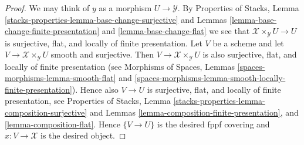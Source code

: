 \documentclass[10pt,a4paper]{amsart}
\theoremstyle{plain}
\theoremstyle{definition}
\theoremstyle{remark}
\numberwithin{equation}{subsection}
\begin{document}
\begin{proof}
We may think of $y$ as a morphism $U \to \mathcal{Y}$. By
Properties of Stacks, Lemma
\ref{stacks-properties-lemma-base-change-surjective}
and
Lemmas \ref{lemma-base-change-finite-presentation} and
\ref{lemma-base-change-flat}
we see that $\mathcal{X} \times_\mathcal{Y} U \to U$ is surjective, flat,
and locally of finite presentation. Let $V$ be a scheme and let
$V \to \mathcal{X} \times_\mathcal{Y} U$ smooth and surjective.
Then $V \to \mathcal{X} \times_\mathcal{Y} U$ is also surjective, flat, and
locally of finite presentation (see
Morphisms of Spaces, Lemmas
\ref{spaces-morphisms-lemma-smooth-flat} and
\ref{spaces-morphisms-lemma-smooth-locally-finite-presentation}).
Hence also $V \to U$ is surjective, flat, and
locally of finite presentation, see
Properties of Stacks, Lemma
\ref{stacks-properties-lemma-composition-surjective}
and
Lemmas \ref{lemma-composition-finite-presentation}, and
\ref{lemma-composition-flat}.
Hence $\{V \to U\}$ is the desired fppf covering and $x : V \to \mathcal{X}$
is the desired object.
\end{proof}
\end{document}

